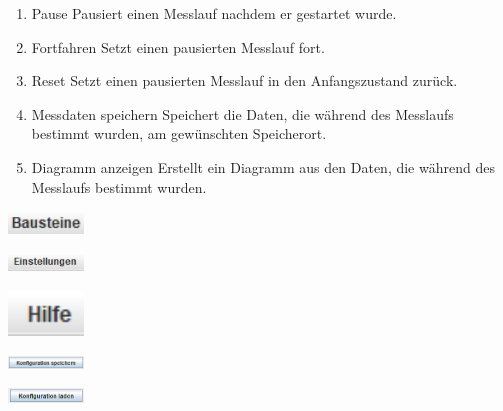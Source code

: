 \documentclass[parskip=full]{scrartcl}
\begin{document}
\begin{enumerate}
    \item Pause
    Pausiert einen Messlauf nachdem er gestartet wurde.
    
    \item Fortfahren
    Setzt einen pausierten Messlauf fort.
    
    \item Reset
    Setzt einen pausierten Messlauf in den Anfangszustand zurück.
    
    \item Messdaten speichern
    Speichert die Daten, die während des Messlaufs bestimmt wurden, am gewünschten Speicherort.
    
    \item Diagramm anzeigen
    Erstellt ein Diagramm aus den Daten, die während des Messlaufs bestimmt wurden.
    
\end{enumerate}

\begin{flushleft}
    \includegraphics[width = 2cm]{Grafiken/1-Bausteine.png}
\end{flushleft}

\begin{flushleft}
    \includegraphics[width = 2cm]{Grafiken/2-Einstellungen.png}
\end{flushleft}

\begin{flushleft}
    \includegraphics[width = 2cm]{Grafiken/3-Hilfe.png}
\end{flushleft}

\begin{flushleft}
    \includegraphics[width = 2cm]{Grafiken/4-Konfiguration_speichern.png}
\end{flushleft}

\begin{flushleft}
    \includegraphics[width = 2cm]{Grafiken/5-Konfiguration_laden.png}
\end{flushleft}
\end{document}
